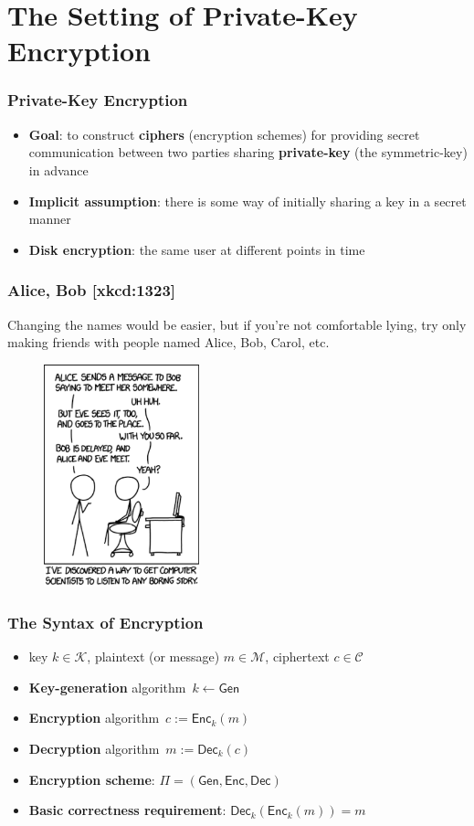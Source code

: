 \section{The Setting of Private-Key Encryption}
\begin{frame}\frametitle{Private-Key Encryption}
\begin{itemize}
\item \textbf{Goal}: to construct \textbf{ciphers} (encryption schemes) for providing secret communication between two parties sharing \textbf{private-key} (the symmetric-key) in advance
\item \textbf{Implicit assumption}: there is some way of initially sharing a key in a secret manner
\item \textbf{Disk encryption}: the same user at different points in time
\end{itemize}
\end{frame}
\begin{frame}\frametitle{Alice, Bob  [xkcd:1323]}
Changing the names would be easier, but if you're not comfortable lying, try only making friends with people named Alice, Bob, Carol, etc.
\begin{figure}
\begin{center}
\includegraphics[width=45mm]{pic/alice-bob} 
\end{center}
\end{figure}
\end{frame}
\begin{frame}\frametitle{The Syntax of Encryption}
\begin{figure}
\begin{center}

\end{center}
\end{figure}
\begin{itemize}
\item key $k \in \mathcal{K}$, plaintext (or message) $m \in \mathcal{M}$, ciphertext $c \in \mathcal{C}$
\item \textbf{Key-generation} algorithm~$k \gets \mathsf{Gen}$
\item \textbf{Encryption} algorithm~$c:= \mathsf{Enc}_k(m)$
\item \textbf{Decryption} algorithm~$m:= \mathsf{Dec}_k(c)$
\item \textbf{Encryption scheme}: $\Pi = (\mathsf{Gen}, \mathsf{Enc}, \mathsf{Dec})$
\item \textbf{Basic correctness requirement}: $\mathsf{Dec}_k(\mathsf{Enc}_k(m)) = m$
\end{itemize}
\end{frame}

